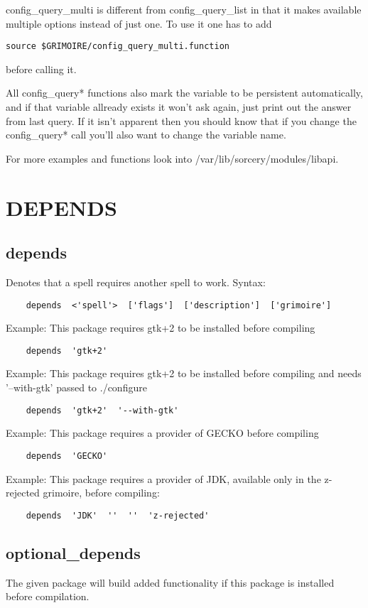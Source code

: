 \documentclass[a4paper,10pt]{book}
\begin{document}
config\_query\_multi is different from config\_query\_list in that it makes
available multiple options instead of just one. To use it one has to add
\begin{verbatim}
source $GRIMOIRE/config_query_multi.function
\end{verbatim}
before calling it.

All config\_query* functions also mark the variable to be persistent
automatically, and if that variable allready exists it won't ask again, just
print out the answer from last query. If it isn't apparent then you should know
that if you change the config\_query* call you'll also want to change the
variable name.

For more examples and functions look into /var/lib/sorcery/modules/libapi.

\section{DEPENDS}
\subsection{depends}
Denotes that a spell requires another spell to work.
Syntax:
\begin{verbatim}
	depends  <'spell'>  ['flags']  ['description']  ['grimoire']
\end{verbatim}


Example: This package requires gtk+2 to be installed before compiling
\begin{verbatim}
	depends  'gtk+2'
\end{verbatim}

Example: This package requires gtk+2 to be installed before compiling and
needs '--with-gtk' passed to ./configure
\begin{verbatim}
	depends  'gtk+2'  '--with-gtk'
\end{verbatim}

Example: This package requires a provider of GECKO before compiling
\begin{verbatim}
	depends  'GECKO'
\end{verbatim}

Example: This package requires a provider of JDK, available only in the
z-rejected grimoire, before compiling:
\begin{verbatim}
	depends  'JDK'  ''  ''  'z-rejected'
\end{verbatim}


\subsection{optional\_depends}
The given package will build added functionality if this package is installed
before compilation.
\end{document}
